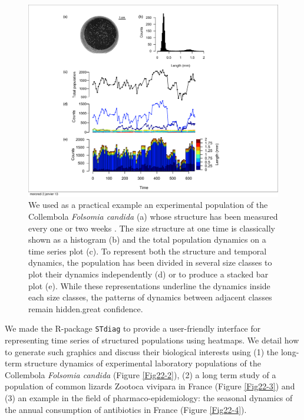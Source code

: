 \begin{figure}[!ht] %
\centering
\includegraphics[height=0.75\textheight]{2_Methodo/Fig/Fig22-1.pdf}
\caption[Classical representation of a
population structure]{ We used as a practical example an experimental population
of the Collembola \textit{Folsomia candida} (a) whose structure has been measured every one or two weeks . The size structure at one time is classically shown as a histogram (b) and the total population dynamics on a time series plot (c). To represent both the structure and temporal dynamics, the population has been divided in
several size classes to plot their dynamics independently (d) or to produce a
stacked bar plot (e). While these representations underline the dynamics inside
each size classes, the patterns of dynamics between adjacent classes remain
hidden.great confidence.
}
\label{Fig22-1}
\end{figure}


We made the R-package \texttt{STdiag} to provide a user-friendly interface for
representing time series of structured populations using heatmaps. We detail how
to generate such graphics and discuss their biological interests using (1) the
long-term structure dynamics of experimental laboratory populations of the
Collembola \textit{Folsomia candida} (Figure \ref{Fig22-2}), (2) a long term study of a population of
common lizards Zootoca vivipara in France (Figure \ref{Fig22-3}) and (3) an example in the
field of pharmaco-epidemiology: the seasonal dynamics of the annual consumption
of antibiotics in France (Figure \ref{Fig22-4}).

